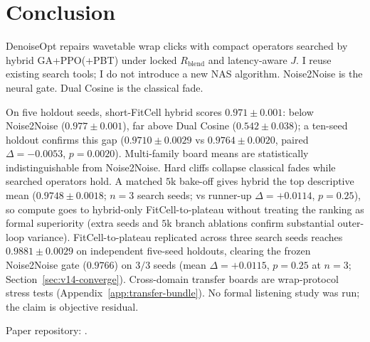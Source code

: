 \section{Conclusion}
\label{sec:conclusion}

DenoiseOpt repairs wavetable wrap clicks with compact operators searched by hybrid GA+PPO(+PBT) under locked $R_{\mathrm{blend}}$ and latency-aware $J$.
I reuse existing search tools; I do not introduce a new NAS algorithm.
Noise2Noise is the neural gate. Dual Cosine is the classical fade.

On five holdout seeds, short-FitCell hybrid scores $0.971{\pm}0.001$: below Noise2Noise ($0.977{\pm}0.001$), far above Dual Cosine ($0.542{\pm}0.038$); a ten-seed holdout confirms this gap ($0.9710{\pm}0.0029$ vs $0.9764{\pm}0.0020$, paired $\Delta{=}{-}0.0053$, $p{=}0.0020$).
Multi-family board means are statistically indistinguishable from Noise2Noise.
Hard cliffs collapse classical fades while searched operators hold.
A matched $5$k bake-off gives hybrid the top descriptive mean ($0.9748{\pm}0.0018$; $n{=}3$ search seeds; vs runner-up $\Delta{=}{+}0.0114$, $p{=}0.25$), so compute goes to hybrid-only FitCell-to-plateau without treating the ranking as formal superiority (extra seeds and $5$k branch ablations confirm substantial outer-loop variance).
FitCell-to-plateau replicated across three search seeds reaches $0.9881{\pm}0.0029$ on independent five-seed holdouts, clearing the frozen Noise2Noise gate ($0.9766$) on $3/3$ seeds (mean $\Delta{=}{+}0.0115$, $p{=}0.25$ at $n{=}3$; Section~\ref{sec:v14-converge}).
Cross-domain transfer boards are wrap-protocol stress tests (Appendix~\ref{app:transfer-bundle}).
No formal listening study was run; the claim is objective residual.

Paper repository: .
